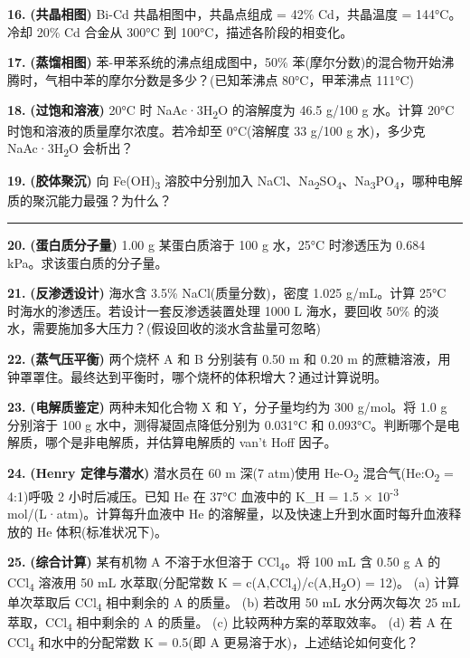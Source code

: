 \documentclass[a4paper,11pt]{ctexart}
\begin{document}
\textbf{16.} \textbf{(共晶相图)} Bi-Cd 共晶相图中，共晶点组成 = 42\% Cd，共晶温度 = 144°C。冷却 20\% Cd 合金从 300°C 到 100°C，描述各阶段的相变化。

\textbf{17.} \textbf{(蒸馏相图)} 苯-甲苯系统的沸点组成图中，50\% 苯(摩尔分数)的混合物开始沸腾时，气相中苯的摩尔分数是多少？(已知苯沸点 80°C，甲苯沸点 111°C)

\textbf{18.} \textbf{(过饱和溶液)} 20°C 时 NaAc·3H\textsubscript{2}O 的溶解度为 46.5 g/100 g 水。计算 20°C 时饱和溶液的质量摩尔浓度。若冷却至 0°C(溶解度 33 g/100 g 水)，多少克 NaAc·3H\textsubscript{2}O 会析出？

\textbf{19.} \textbf{(胶体聚沉)} 向 Fe(OH)\textsubscript{3} 溶胶中分别加入 NaCl、Na\textsubscript{2}SO\textsubscript{4}、Na\textsubscript{3}PO\textsubscript{4}，哪种电解质的聚沉能力最强？为什么？

\begin{center}\rule{0.5\linewidth}{0.5pt}\end{center}

\textbf{20.} \textbf{(蛋白质分子量)} 1.00 g 某蛋白质溶于 100 g 水，25°C 时渗透压为 0.684 kPa。求该蛋白质的分子量。

\textbf{21.} \textbf{(反渗透设计)} 海水含 3.5\% NaCl(质量分数)，密度 1.025 g/mL。计算 25°C 时海水的渗透压。若设计一套反渗透装置处理 1000 L 海水，要回收 50\% 的淡水，需要施加多大压力？(假设回收的淡水含盐量可忽略)

\textbf{22.} \textbf{(蒸气压平衡)} 两个烧杯 A 和 B 分别装有 0.50 m 和 0.20 m 的蔗糖溶液，用钟罩罩住。最终达到平衡时，哪个烧杯的体积增大？通过计算说明。

\textbf{23.} \textbf{(电解质鉴定)} 两种未知化合物 X 和 Y，分子量均约为 300 g/mol。将 1.0 g 分别溶于 100 g 水中，测得凝固点降低分别为 0.031°C 和 0.093°C。判断哪个是电解质，哪个是非电解质，并估算电解质的 van't Hoff 因子。

\textbf{24.} \textbf{(Henry 定律与潜水)} 潜水员在 60 m 深(7 atm)使用 He-O\textsubscript{2} 混合气(He:O\textsubscript{2} = 4:1)呼吸 2 小时后减压。已知 He 在 37°C 血液中的 K\_H = 1.5 × 10\textsuperscript{-3} mol/(L·atm)。计算每升血液中 He 的溶解量，以及快速上升到水面时每升血液释放的 He 体积(标准状况下)。

\textbf{25.} \textbf{(综合计算)} 某有机物 A 不溶于水但溶于 CCl\textsubscript{4}。将 100 mL 含 0.50 g A 的 CCl\textsubscript{4} 溶液用 50 mL 水萃取(分配常数 K = c(A,CCl\textsubscript{4})/c(A,H\textsubscript{2}O) = 12)。
(a) 计算单次萃取后 CCl\textsubscript{4} 相中剩余的 A 的质量。
(b) 若改用 50 mL 水分两次每次 25 mL 萃取，CCl\textsubscript{4} 相中剩余的 A 的质量。
(c) 比较两种方案的萃取效率。
(d) 若 A 在 CCl\textsubscript{4} 和水中的分配常数 K = 0.5(即 A 更易溶于水)，上述结论如何变化？
\end{document}
